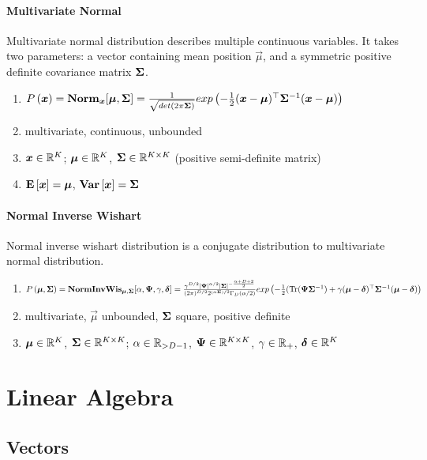 \paragraph{Multivariate Normal}

Multivariate normal distribution describes multiple continuous variables. It takes two parameters: a vector containing mean position $\vec{\mu}$, and a symmetric positive definite covariance matrix $\mathbf{\Sigma}$.
\begin{enumerate}
	\item $P\left(\boldsymbol{x}\right)=\mathbf{Norm}_{\boldsymbol{x}}[\boldsymbol{\mu},\mathbf{\Sigma}]=\frac{1}{\sqrt{det(2\pi\mathbf{\Sigma})}}exp\left(-\frac{1}{2}(\boldsymbol{x}-\boldsymbol{\mu}){}^\top\mathbf{\Sigma}^{-1}(\boldsymbol{x}-\boldsymbol{\mu})\right)$
	\item multivariate, continuous, unbounded
	\item $\boldsymbol{x} \in \mathbb{R}^K$; $\boldsymbol{\mu} \in \mathbb{R}^K$, $\mathbf{\Sigma} \in \mathbb{R}^{K \times K}$ (positive semi-definite matrix)
	\item $\mathbf{E}\left[\boldsymbol{x}\right]=\boldsymbol{\mu}$, $\mathbf{Var}\left[\boldsymbol{x}\right]=\mathbf{\Sigma}$
\end{enumerate}

\paragraph{Normal Inverse Wishart}

Normal inverse wishart distribution is a conjugate distribution to multivariate normal distribution.
\begin{enumerate}
	\item $\P{\vec{\mu},\cov}=\NIW_{\vec{\mu},\cov}[\al,\vec{\Ps},\ga,\vec{\de}] \\ =\frac{\ga^{D/2}\det{\vec{\Ps}}^{\al/2}\det{\cov}^{-\frac{\al+D+2}{2}}}{(2\pi)^{D/2}2^{(\al\cov)/2}\Ga_D(\al/2)}\e{-\half(\Tr(\vec{\Ps}\cov\inv)+\ga(\vec{\mu}-\vec{\de})\T\cov\inv(\vec{\mu}-\vec{\de})}$
	\item multivariate, $\vec{\mu}$ unbounded, $\mathbf{\Sigma}$ square, positive definite
	\item $\boldsymbol{\mu} \in \mathbb{R}^K$, $\mathbf{\Sigma} \in \mathbb{R}^{K \times K}$; $\alpha \in \mathbb{R}_{>D-1}$, $\boldsymbol{\Psi} \in \mathbb{R}^{K \times K}$, $\gamma \in \mathbb{R}_+$, $\boldsymbol{\delta} \in \mathbb{R}^K$
\end{enumerate}



\section{Linear Algebra}
\label{section2.2}

\subsection{Vectors}

